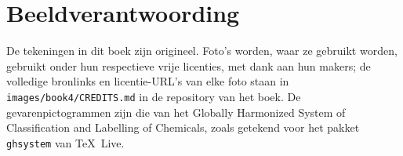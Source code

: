 \chapter*{Beeldverantwoording}

De tekeningen in dit boek zijn origineel. Foto's worden, waar ze gebruikt
worden, gebruikt onder hun respectieve vrije licenties, met dank aan hun
makers; de volledige bronlinks en licentie-URL's van elke foto staan in
\texttt{images/book4/CREDITS.md} in de repository van het boek.
De gevarenpictogrammen zijn die van het Globally Harmonized System of
Classification and Labelling of Chemicals, zoals getekend voor het pakket
\texttt{ghsystem} van \TeX\ Live.

